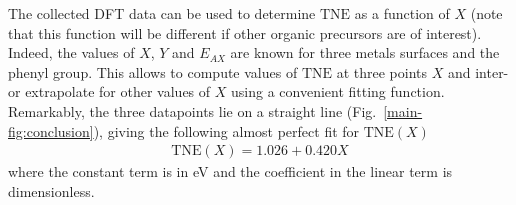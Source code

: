 \documentclass[aps,prl,reprint,amsmath,amssymb,floatfix,notitlepage]{revtex4-1}
\begin{document}
The collected DFT data can be used to determine $\text{TNE}$ as a function of $X$ (note that this function will be different if other organic precursors are of interest). Indeed, the values of $X$, $Y$ and $E_{AX}$ are known for three metals surfaces and the phenyl group. This allows to compute values of $\text{TNE}$ at three points $X$ and inter- or extrapolate for other values of $X$ using a convenient fitting function. Remarkably, the three datapoints lie on a straight line (Fig.~\ref{main-fig:conclusion}), giving the following almost perfect fit for $\text{TNE}(X)$
%
\begin{equation} \label{eq:TNEfit}
\begin{split}
\text{TNE}(X) = 1.026 + 0.420 X
\end{split}
\end{equation}
%
where the constant term is in \si{\electronvolt} and the coefficient in the linear term is dimensionless. 


\end{document}
